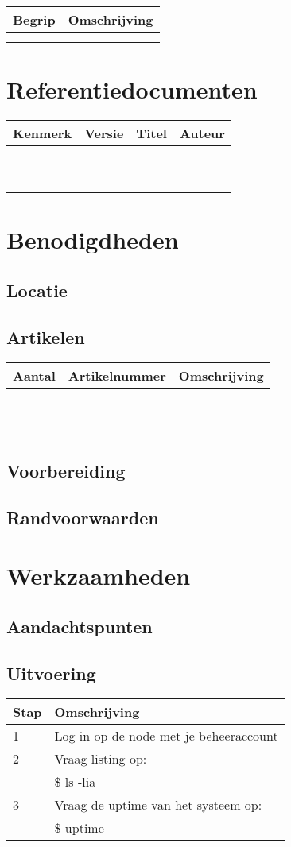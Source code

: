 \documentclass[10pt,a4paper]{report}
\newcommand*{\monofont}{\fontfamily{pcr}\selectfont}
\begin{document}
\begin{tabular}{| l | l |}
\hline
\rowcolor[gray]{0.84}Begrip & Omschrijving\\
\hline
  &  \\
\hline
  &  \\
\hline
\end{tabular}
\chapter{Referentiedocumenten}
\begin{tabular}{| l | l | l | l |}
\hline
\rowcolor[gray]{0.84}Kenmerk & Versie & Titel & Auteur\\
\hline
\ & \ & \ & \ \\
\hline
\ & \ & \ & \ \\
\hline
\end{tabular}
\chapter{Benodigdheden}
\section{Locatie}
\section{Artikelen}
\begin{tabular}{| l | l | l |}
\hline
\rowcolor[gray]{0.84}Aantal & Artikelnummer & Omschrijving\\
\hline
\ & \ & \ \\
\hline
\ & \ & \ \\
\hline
\end{tabular}
\section{Voorbereiding}
\section{Randvoorwaarden}
\chapter{Werkzaamheden}
\section{Aandachtspunten}
\section{Uitvoering}
\begin{tabular}{| l | l |}
\hline
\rowcolor[gray]{0.84}Stap & Omschrijving\\
\hline
1 & Log in op de node met je beheeraccount \\
\hline
2 & Vraag listing op: \\
\hline
\ & \monofont \$ ls -lia\\
\hline
3 & Vraag de uptime van het systeem op: \\
\hline
\ & \monofont \$ uptime\\
\hline
\end{tabular}
\end{document}
